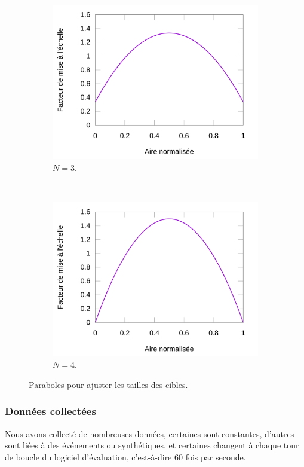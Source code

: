 \begin{figure}[!htb]
\begin{subfigure}[t]{0.49\textwidth}
			\includegraphics[width=\textwidth]{figures/ch5/parabola3}
			\caption{$N=3$.}
			\label{fig:parabola3}
		\end{subfigure}		
		~
		\begin{subfigure}[t]{0.49\textwidth}
			\centering
			\includegraphics[width=\textwidth]{figures/ch5/parabola4}
			\caption{$N=4$.}
			\label{fig:parabola4}
		\end{subfigure}
		\caption[Paraboles pour ajuster les tailles des cibles]{Paraboles pour ajuster les tailles des cibles.}
		\label{fig:parabolae}
	\end{figure}
		
	\subsubsection{Données collectées}
	Nous avons collecté de nombreuses données, certaines sont constantes, d'autres sont liées à des événements ou synthétiques, et certaines changent à chaque tour de boucle du logiciel d'évaluation, c'est-à-dire 60 fois par seconde.
	
